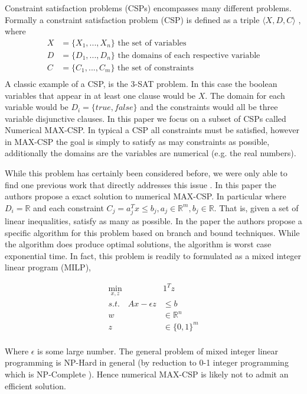 \documentclass[a4paper]{article}
\begin{document}
Constraint satisfaction problems (CSPs) encompasses many different problems. Formally a 
constraint satisfaction problem (CSP) is defined as a triple $\langle X, D, C \rangle$ \cite{wiki_CSP}, where 
\begin{align*}
	X &= \{X_1, ..., X_n\} \text{ the set of variables}\\
	D &= \{D_1, ..., D_n\} \text{ the domains of each respective variable}\\
	C &= \{C_1, ..., C_m\} \text{ the set of constraints}\\
\end{align*}
A classic example of a CSP, is the 3-SAT problem. In this case
the boolean variables that appear in at least one clause would be $X$. The domain for 
each variable would be $D_i = \{true, false\}$ and the constraints would all be 
three variable disjunctive clauses. 
In this paper we focus on a subset of CSPs called Numerical MAX-CSP. 
In typical a CSP all constraints must be satisfied, however in MAX-CSP the goal is simply to 
satisfy as may constraints as possible, additionally the domains are the variables 
are numerical (e.g. the real numbers). 

While this problem has certainly been considered before, we were only able to find one previous 
work that directly addresses this issue \cite{num_max_csp_paper}.
In this paper the authors propose a exact solution to numerical MAX-CSP. In particular where 
$D_i = \mathds{R}$ and each constraint $C_j = a_j^Tx \leq b_j, a_j \in \mathds{R}^m, b_j \in \mathds{R}$. 
That is, given a set of linear inequalities, satisfy as many as possible. In the paper the authors 
propose a specific algorithm for this problem based on branch and bound techniques. While the algorithm 
does produce optimal solutions, the algorithm is worst case exponential time.
In fact, this problem is readily to formulated as a mixed integer linear program (MILP),

\begin{align*}
\min_{x,z}\quad &1^Tz\\
s.t. \quad Ax - \epsilon z &\leq b\\
		w &\in \mathds{R}^n\\
		z &\in \{0,1\}^m\\
\end{align*}

Where $\epsilon$ is some large number. The general problem of mixed integer linear programming is 
NP-Hard in general (by reduction to 0-1 integer programming which is NP-Complete \cite{karp_1972}). Hence 
numerical MAX-CSP is likely not to admit an efficient solution. 
\end{document}
